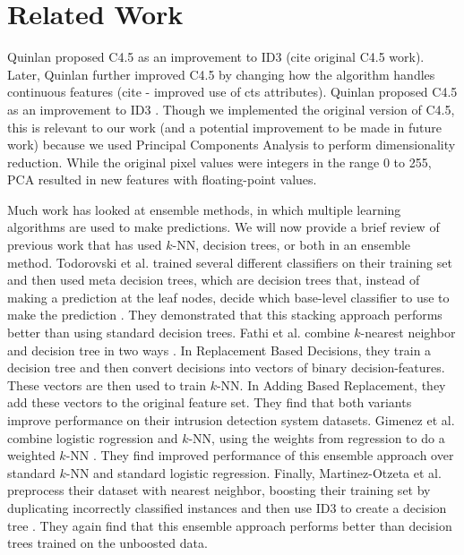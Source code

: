 \section{Related Work}
Quinlan proposed C4.5 as an improvement to ID3 (cite original C4.5 work). Later, Quinlan further improved C4.5 by changing how the algorithm handles continuous features (cite - improved use of cts attributes). Quinlan proposed C4.5 as an improvement to ID3 \cite{quinlan2014c4}. Though we implemented the original version of C4.5, this is relevant to our work (and a potential improvement to be made in future work) because we used Principal Components Analysis to perform dimensionality reduction.  While the original pixel values were integers in the range 0 to 255, PCA resulted in new features with floating-point values.

Much work has looked at ensemble methods, in which multiple learning algorithms are used to make predictions. We will now provide a brief review of previous work that has used $k$-NN, decision trees, or both in an ensemble method. Todorovski et al. trained several different classifiers on their training set and then used meta decision trees, which are decision trees that, instead of making a prediction at the leaf nodes, decide which base-level classifier to use to make the prediction \cite{todorovski2003combining}. They demonstrated that this stacking approach performs better than using standard decision trees.
Fathi et al. combine $k$-nearest neighbor and decision tree in two ways \cite{FathiMazinani}. In Replacement Based Decisions, they train a decision tree and then convert decisions into vectors of binary decision-features. These vectors are then used to train $k$-NN. In Adding Based Replacement, they add these vectors to the original feature set. They find that both variants improve performance on their intrusion detection system datasets.
Gimenez et al. combine logistic rogression and $k$-NN, using the weights from regression to do a weighted $k$-NN \cite{campillo2013improving}. They find improved performance of this ensemble approach over standard $k$-NN and standard logistic regression. Finally, Martinez-Otzeta et al. preprocess their dataset with nearest neighbor, boosting their training set by duplicating incorrectly classified instances and then use ID3 to create a decision tree \cite{martinezk}. They again find that this ensemble approach performs better than decision trees trained on the unboosted data. 
